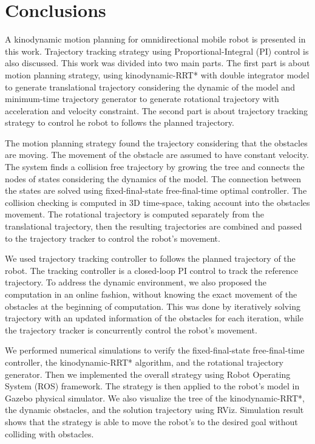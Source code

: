 \documentclass[../thesis.tex]{subfiles}
\begin{document}
\section{Conclusions}

A kinodynamic motion planning for omnidirectional mobile robot is presented in this work. Trajectory tracking strategy using Proportional-Integral (PI) control is also discussed. This work was divided into two main parts. The first part is about motion planning strategy, using kinodynamic-RRT* with double integrator model to generate translational trajectory considering the dynamic of the model and minimum-time trajectory generator to generate rotational trajectory with acceleration and velocity constraint. The second part is about trajectory tracking strategy to control he robot to follows the planned trajectory.  

The motion planning strategy found the trajectory considering that the obstacles are moving. The movement of the obstacle are assumed to have constant velocity. The system finds a collision free trajectory by growing the tree and connects the nodes of states considering the dynamics of the model. The connection between the states are solved using fixed-final-state free-final-time optimal controller. The collision checking is computed in 3D time-space, taking account into the obstacles movement. The rotational trajectory is computed separately from the translational trajectory, then the resulting trajectories are combined and passed to the trajectory tracker to control the robot's movement.

We used trajectory tracking controller to follows the planned trajectory of the robot. The tracking controller is a closed-loop PI control to track the reference trajectory. To address the dynamic environment, we also proposed the computation in an online fashion, without knowing the exact movement of the obstacles at the beginning of computation. This was done by iteratively solving trajectory with an updated information of the obstacles for each iteration, while the trajectory tracker is concurrently control the robot's movement.

We performed numerical simulations to verify the fixed-final-state free-final-time controller, the kinodynamic-RRT* algorithm, and the rotational trajectory generator. Then we implemented the overall strategy using Robot Operating System (ROS) framework. The strategy is then applied to the robot's model in Gazebo physical simulator. We also visualize the tree of the kinodynamic-RRT*, the dynamic obstacles, and the solution trajectory using RViz. Simulation result shows that the strategy is able to move the robot's to the desired goal without colliding with obstacles.
\end{document}

